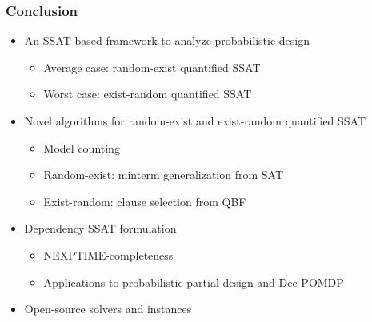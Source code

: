 \begin{frame}
      \frametitle{Conclusion}
      \begin{itemize}
            \item An SSAT-based framework to analyze probabilistic design
                  \pause
                  \begin{itemize}
                        \item Average case: random-exist quantified SSAT
                              \pause
                        \item Worst case: exist-random quantified SSAT
                              \pause
                  \end{itemize}
            \item Novel algorithms for random-exist and exist-random quantified SSAT
                  \pause
                  \begin{itemize}
                        \item Model counting
                              \pause
                        \item Random-exist: minterm generalization from SAT
                              \pause
                        \item Exist-random: clause selection from QBF
                              \pause
                  \end{itemize}
            \item Dependency SSAT formulation
                  \pause
                  \begin{itemize}
                        \item NEXPTIME-completeness
                              \pause
                        \item Applications to probabilistic partial design and Dec-POMDP
                              \pause
                  \end{itemize}
            \item Open-source solvers and instances
      \end{itemize}
\end{frame}

